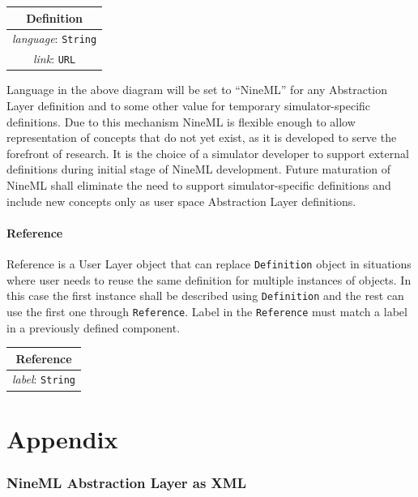 \documentclass{article}
\begin{document}
\begin{table}[htb]
\center
\begin{tabular}{|c|}
\hline
\hline
Definition \\
\hline
\hline
{\em language}: {\tt String} \\
\hline
{\em link}: {\tt URL}\\
\hline
\end{tabular}
\end{table}

Language in the above diagram will be set to ``NineML'' for any Abstraction
Layer definition and to some other value for temporary simulator-specific
definitions. Due to this mechanism
NineML is flexible enough to allow representation of concepts that do not
yet exist, as it is developed to serve the forefront of research.
It is the choice of a simulator developer to support external definitions
during initial stage of NineML development. Future maturation of NineML shall
eliminate the need to support simulator-specific definitions and include new
concepts only as user space Abstraction Layer definitions.

\subsection{Reference}

Reference is a User Layer object that can replace {\tt Definition} object
in situations where user needs to reuse the same definition for multiple
instances of objects. In this case the first instance shall be described using
{\tt Definition} and the rest can use the first one through {\tt Reference}.
Label in the {\tt Reference} must match a label in a previously defined
component.

\begin{table}[htb]
\center
\begin{tabular}{|c|}
\hline
\hline
Reference \\
\hline
\hline
{\em label}: {\tt String} \\
\hline
\end{tabular}
\end{table}

\newpage
\appendix

\part*{Appendix}

\section{NineML Abstraction Layer as XML}
\end{document}
